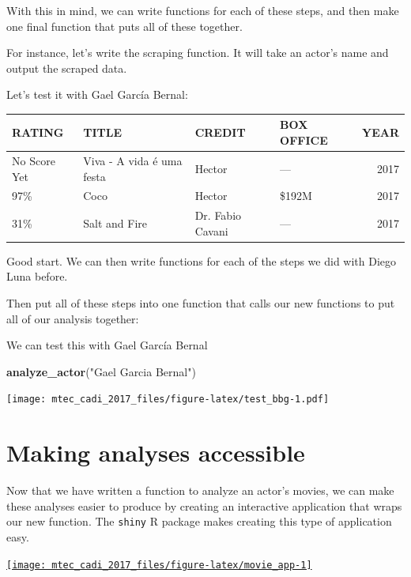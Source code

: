 \documentclass[12pt,]{book}
\newenvironment{Shaded}{\begin{snugshade}}{\end{snugshade}}
\newcommand{\KeywordTok}[1]{\textcolor[rgb]{0.13,0.29,0.53}{\textbf{#1}}}
\newcommand{\StringTok}[1]{\textcolor[rgb]{0.31,0.60,0.02}{#1}}
\newcommand{\NormalTok}[1]{#1}
\theoremstyle{definition}
\theoremstyle{definition}
\theoremstyle{definition}
\theoremstyle{remark}
\begin{document}
With this in mind, we can write functions for each of these steps, and
then make one final function that puts all of these together.

For instance, let's write the scraping function. It will take an actor's
name and output the scraped data.

Let's test it with Gael García Bernal:

\begin{tabular}{l|l|l|l|r}
\hline
RATING & TITLE & CREDIT & BOX OFFICE & YEAR\\
\hline
No Score Yet & Viva - A vida é uma festa & Hector & — & 2017\\
\hline
97\% & Coco & Hector & \$192M & 2017\\
\hline
31\% & Salt and Fire & Dr. Fabio Cavani & — & 2017\\
\hline
\end{tabular}

Good start. We can then write functions for each of the steps we did
with Diego Luna before.

Then put all of these steps into one function that calls our new
functions to put all of our analysis together:

We can test this with Gael García Bernal

\begin{Shaded}
\begin{Highlighting}[]
\KeywordTok{analyze_actor}\NormalTok{(}\StringTok{"Gael Garcia Bernal"}\NormalTok{)}
\end{Highlighting}
\end{Shaded}

\texttt{[image: mtec\_cadi\_2017\_files/figure-latex/test\_bbg-1.pdf]}

\section{Making analyses accessible}\label{making-analyses-accessible}

Now that we have written a function to analyze an actor's movies, we can
make these analyses easier to produce by creating an interactive
application that wraps our new function. The \texttt{shiny} R package
makes creating this type of application easy.

\begin{center}\href{https://hcorrada.shinyapps.io/movie_app/}{\texttt{[image: mtec\_cadi\_2017\_files/figure-latex/movie\_app-1]} }\end{center}
\end{document}
